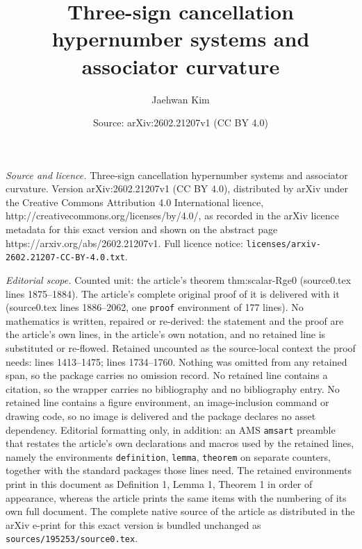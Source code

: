 \documentclass[10pt,a4paper]{amsart}
\title{Three-sign cancellation hypernumber systems and associator curvature}
\author{Jaehwan Kim}
\date{Source: arXiv:2602.21207v1 (CC BY 4.0)}
\begin{document}
\maketitle

\noindent\emph{Source and licence.} Three-sign cancellation hypernumber systems and associator curvature. Version arXiv:2602.21207v1 (CC BY 4.0), distributed by arXiv under the Creative Commons Attribution 4.0 International licence, http://creativecommons.org/licenses/by/4.0/, as recorded in the arXiv licence metadata for this exact version and shown on the abstract page https://arxiv.org/abs/2602.21207v1. Full licence notice: \texttt{licenses/arxiv-2602.21207-CC-BY-4.0.txt}.\par\smallskip

\noindent\textit{Editorial scope.} Counted unit: the article's theorem thm:scalar-Rge0 (source0.tex lines 1875--1884). The article's complete original proof of it is delivered with it (source0.tex lines 1886--2062, one \texttt{proof} environment of 177 lines). No mathematics is written, repaired or re-derived: the statement and the proof are the article's own lines, in the article's own notation, and no retained line is substituted or re-flowed.  Retained uncounted as the source-local context the proof needs: lines 1413--1475; lines 1734--1760.  Nothing was omitted from any retained span, so the package carries no omission record.  No retained line contains a citation, so the wrapper carries no bibliography and no bibliography entry.  No retained line contains a figure environment, an image-inclusion command or drawing code, so no image is delivered and the package declares no asset dependency.  Editorial formatting only, in addition: an AMS \texttt{amsart} preamble that restates the article's own declarations and macros used by the retained lines, namely the environments \texttt{definition}, \texttt{lemma}, \texttt{theorem} on separate counters, together with the standard packages those lines need.  The retained environments print in this document as Definition 1, Lemma 1, Theorem 1 in order of appearance, whereas the article prints the same items with the numbering of its own full document.  The complete native source of the article as distributed in the arXiv e-print for this exact version is bundled unchanged as \texttt{sources/195253/source0.tex}.
\end{document}
